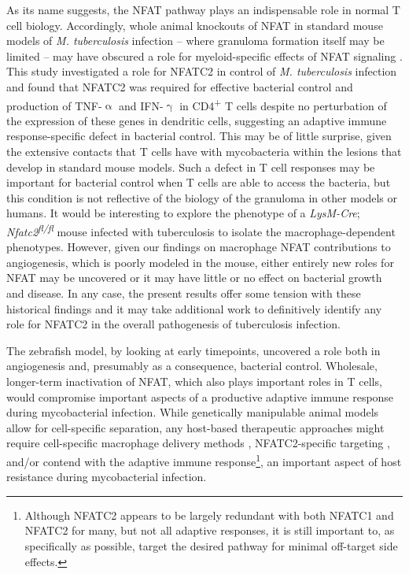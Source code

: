As its name suggests, the NFAT pathway plays an indispensable role in normal T cell biology. Accordingly, whole animal knockouts of NFAT in standard mouse models of \textit{M. tuberculosis} infection -- where granuloma formation itself may be limited -- may have obscured a role for myeloid-specific effects of NFAT signaling \citep{Via2012}. This study investigated a role for NFATC2 in control of \textit{M. tuberculosis} infection and found that NFATC2 was required for effective bacterial control and production of TNF-$\upalpha$ and IFN-$\upgamma$ in CD4\textsuperscript{+} T cells despite no perturbation of the expression of these genes in dendritic cells, suggesting an adaptive immune response-specific defect in bacterial control. This may be of little surprise, given the extensive contacts that T cells have with mycobacteria within the lesions that develop in standard mouse models. Such a defect in T cell responses may be important for bacterial control when T cells are able to access the bacteria, but this condition is not reflective of the biology of the granuloma in other models or humans. It would be interesting to explore the phenotype of a \textit{LysM-Cre}; \textit{Nfatc2\textsuperscript{fl/fl}} mouse infected with tuberculosis to isolate the macrophage-dependent phenotypes. However, given our findings on macrophage NFAT contributions to angiogenesis, which is poorly modeled in the mouse, either entirely new roles for NFAT may be uncovered or it may have little or no effect on bacterial growth and disease. In any case, the present results offer some tension with these historical findings and it may take additional work to definitively identify any role for NFATC2 in the overall pathogenesis of tuberculosis infection.

The zebrafish model, by looking at early timepoints, uncovered a role both in angiogenesis and, presumably as a consequence, bacterial control. Wholesale, longer-term inactivation of NFAT, which also plays important roles in T cells, would compromise important aspects of a productive adaptive immune response during mycobacterial infection. While genetically manipulable animal models allow for cell-specific separation, any host-based therapeutic approaches might require cell-specific macrophage delivery methods \citep{Hu2019, Mukhtar2020, Colombo2022}, NFATC2-specific targeting \citep{Kitamura2021}, and/or contend with the adaptive immune response\footnote{Although NFATC2 appears to be largely redundant with both NFATC1 and NFATC2 for many, but not all adaptive responses, it is still important to, as specifically as possible, target the desired pathway for minimal off-target side effects.}, an important aspect of host resistance during mycobacterial infection.

